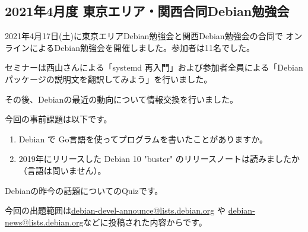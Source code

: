 \documentclass[mingoth,a4paper]{jsarticle}
\begin{document}

\subsection{2021年4月度 東京エリア・関西合同Debian勉強会}

2021年4月17日(土)に東京エリアDebian勉強会と関西Debian勉強会の合同で
オンラインによるDebian勉強会を開催しました。参加者は11名でした。

セミナーは西山さんによる「systemd 再入門」および参加者全員による「Debianパッケージの説明文を翻訳してみよう」を行いました。


その後、Debianの最近の動向について情報交換を行いました。


今回の事前課題は以下です。

\begin{enumerate}
 \item Debian で Go言語を使ってプログラムを書いたことがありますか。
 \item 2019年にリリースした Debian 10 "buster" のリリースノートは読みましたか（言語は問いません）。
\end{enumerate}


\begin{multicols}{2}
{\small
  
}
\end{multicols}


Debianの昨今の話題についてのQuizです。

今回の出題範囲は\url{debian-devel-announce@lists.debian.org} や \url{debian-news@lists.debian.org}などに投稿された内容からです。

\begin{multicols}{2}
 
\end{multicols}



\end{document}
